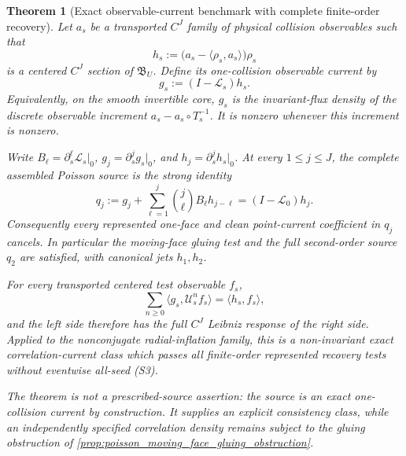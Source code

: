 \documentclass[11pt]{amsart}
\theoremstyle{compactplain}
\newtheorem{theorem}{Theorem}[section]
\theoremstyle{compactdefinition}
\theoremstyle{compactremark}
\newcommand{\Ltransfer}{\mathscr L}
\begin{document}
\begin{theorem}[Exact observable-current benchmark with complete finite-order recovery]
\label{thm:natural_observable_current_recovery}
Let \(a_s\) be a transported \(C^J\) family of physical collision
observables such that
\begin{equation}
\label{eq:natural_observable_current_primitive}
 h_s:=\bigl(a_s-\langle\rho_s,a_s\rangle\bigr)\rho_s
\end{equation}
is a centered \(C^J\) section of \(\mathfrak B_U\).  Define its one-collision
observable current by
\begin{equation}
\label{eq:natural_observable_current_source}
 g_s:=(I-\Ltransfer_s)h_s.
\end{equation}
Equivalently, on the smooth invertible core, \(g_s\) is the invariant-flux
density of the discrete observable increment
\(a_s-a_s\circ T_s^{-1}\).  It is nonzero whenever this increment is nonzero.

Write \(B_\ell=\partial_s^\ell\Ltransfer_s|_0\),
\(g_j=\partial_s^jg_s|_0\), and \(h_j=\partial_s^jh_s|_0\).  At every
\(1\le j\le J\), the complete assembled Poisson source is the strong identity
\begin{equation}
\label{eq:natural_observable_current_all_order_recovery}
 q_j:=g_j+
 \sum_{\ell=1}^j\binom j\ell B_\ell h_{j-\ell}
 =(I-\Ltransfer_0)h_j.
\end{equation}
Consequently every represented one-face and clean point-current coefficient
in \(q_j\) cancels.  In particular the moving-face gluing test and the full
second-order source \(q_2\) are satisfied, with canonical jets \(h_1,h_2\).

For every transported centered test observable \(f_s\),
\begin{equation}
\label{eq:natural_observable_current_susceptibility}
 \sum_{n\ge0}\langle g_s,\mathscr U_s^nf_s\rangle
 =\langle h_s,f_s\rangle,
\end{equation}
and the left side therefore has the full \(C^J\) Leibniz response of the
right side.  Applied to the nonconjugate radial-inflation family, this is a
non-invariant exact correlation-current class which passes
all finite-order represented recovery tests without eventwise all-seed (S3).

The theorem is not a prescribed-source assertion: the source is an exact
one-collision current by construction.  It supplies an explicit consistency
class, while an independently specified correlation density remains subject
to the gluing obstruction of
\cref{prop:poisson_moving_face_gluing_obstruction}.
\end{theorem}
\end{document}
